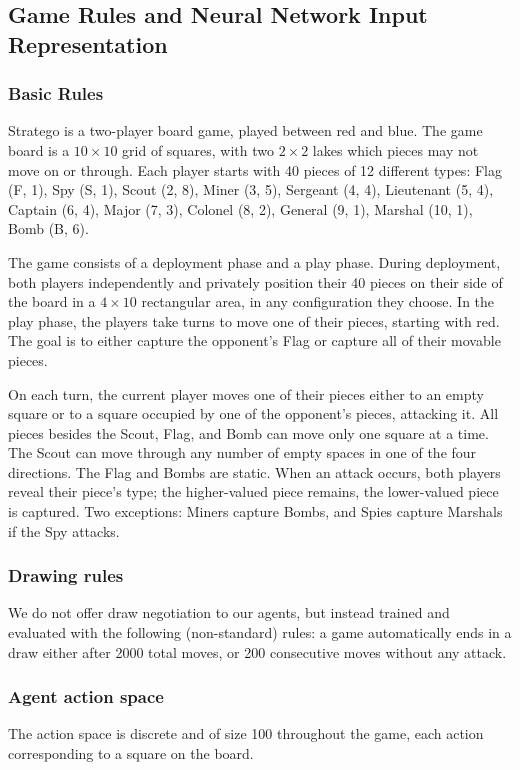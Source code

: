 \subsection{Game Rules and Neural Network Input Representation}

\subsubsection{Basic Rules}
Stratego is a two-player board game, played between red and blue. The game board is a $10 \times 10$ grid of squares, with two $2 \times 2$ lakes which pieces may not move on or through. Each player starts with 40 pieces of 12 different types: Flag (F, 1), Spy (S, 1), Scout (2, 8), Miner (3, 5), Sergeant (4, 4), Lieutenant (5, 4), Captain (6, 4), Major (7, 3), Colonel (8, 2), General (9, 1), Marshal (10, 1), Bomb (B, 6).

The game consists of a deployment phase and a play phase. During deployment, both players independently and privately position their 40 pieces on their side of the board in a $4 \times 10$ rectangular area, in any configuration they choose. In the play phase, the players take turns to move one of their pieces, starting with red. The goal is to either capture the opponent's Flag or capture all of their movable pieces.

On each turn, the current player moves one of their pieces either to an empty square or to a square occupied by one of the opponent's pieces, attacking it. All pieces besides the Scout, Flag, and Bomb can move only one square at a time. The Scout can move through any number of empty spaces in one of the four directions. The Flag and Bombs are static. When an attack occurs, both players reveal their piece's type; the higher-valued piece remains, the lower-valued piece is captured. Two exceptions: Miners capture Bombs, and Spies capture Marshals if the Spy attacks.

\subsubsection{Drawing rules}
We do not offer draw negotiation to our agents, but instead trained and evaluated with the following (non-standard) rules: a game automatically ends in a draw either after 2000 total moves, or 200 consecutive moves without any attack.

\subsubsection{Agent action space}
The action space is discrete and of size 100 throughout the game, each action corresponding to a square on the board.

